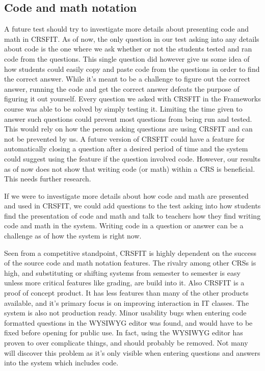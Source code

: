 \subsection{Code and math notation}
A future test should try to investigate more details about presenting code and math in CRSFIT. As of now, the only question in our test asking into any details about code is the one where we ask whether or not the students tested and ran code from the questions. This single question did however give us some idea of how students could easily copy and paste code from the questions in order to find the correct answer. While it's meant to be a challenge to figure out the correct answer, running the code and get the correct answer defeats the purpose of figuring it out yourself. Every question we asked with CRSFIT in the Frameworks course was able to be solved by simply testing it. Limiting the time given to answer such questions could prevent most questions from being run and tested. This would rely on how the person asking questions are using CRSFIT and can not be prevented by us. A future version of CRSFIT could have a feature for automatically closing a question after a desired period of time and the system could suggest using the feature if the question involved code. However, our results as of now does not show that writing code (or math) within a CRS is beneficial. This needs further research.


If we were to investigate more details about how code and math are presented and used in CRSFIT, we could add questions to the test asking into how students find the presentation of code and math and talk to teachers how they find writing code and math in the system. Writing code in a question or answer can be a challenge as of how the system is right now. %

Seen from a competitive standpoint, CRSFIT is highly dependent on the success of the source code and math notation features. The rivalry among other CRSs is high, and substituting or shifting systems from semester to semester is easy unless more critical features like grading, are build into it. Also CRSFIT is a proof of concept product. It has less features than many of the other products available, and it's primary focus is on improving interaction in IT classes. The system is also not production ready. Minor usability bugs when entering code formatted questions in the WYSIWYG editor was found, and would have to be fixed before opening for public use. In fact, using the WYSIWYG editor has proven to over complicate things, and should probably be removed. Not many will discover this problem as it's only visible when entering questions and answers into the system which includes code.


